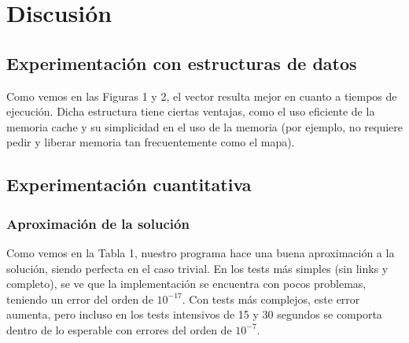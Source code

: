 \section{Discusión}


\subsection{Experimentación con estructuras de datos}
Como vemos en las Figuras 1 y 2, el vector resulta mejor en cuanto a tiempos de ejecución. Dicha estructura tiene ciertas ventajas, como el uso eficiente de la memoria cache y su simplicidad en el uso de la memoria (por ejemplo, no requiere pedir y liberar memoria tan frecuentemente como el mapa).


\subsection{Experimentación cuantitativa}
\subsubsection{Aproximación de la solución}
Como vemos en la Tabla 1, nuestro programa hace una buena aproximación a la solución, siendo perfecta en el caso trivial. En los tests más simples (sin links y completo), se ve que la implementación se encuentra con pocos problemas, teniendo un error del orden de $10^{-17}$. Con tests más complejos, este error aumenta, pero incluso en los tests intensivos de 15 y 30 segundos se comporta dentro de lo esperable con errores del orden de $10^{-7}$.

